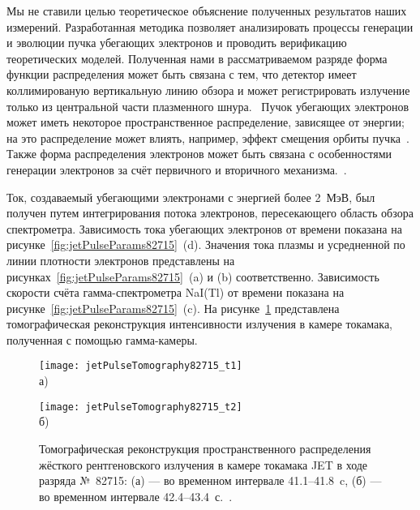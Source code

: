 Мы не ставили целью теоретическое объяснение полученных результатов наших измерений. Разработанная методика позволяет анализировать процессы генерации и эволюции пучка убегающих электронов и проводить верификацию теоретических моделей. Полученная нами в рассматриваемом разряде форма функции распределения может быть связана с тем, что детектор имеет коллимированую вертикальную линию обзора и может регистрировать излучение только из центральной части плазменного шнура.~\cite{Shevelev2013} Пучок убегающих электронов может иметь некоторое пространственное распределение, зависящее от энергии; на это распределение может влиять, например, эффект смещения орбиты пучка~\cite{Knoepfel1979}. Также форма распределения электронов может быть связана с особенностями генерации электронов за счёт первичного и вторичного механизма.~\cite{Helander2002}.

Ток, создаваемый убегающими электронами с энергией более 2~МэВ, был получен путем интегрирования потока электронов, пересекающего область обзора спектрометра. Зависимость тока убегающих электронов от времени показана на рисунке~\ref{fig:jetPulseParams82715}~(d). Значения тока плазмы и усредненной по линии плотности электронов представлены на рисунках~\ref{fig:jetPulseParams82715}~(a) и (b) соответственно. Зависимость скорости счёта гамма-спектрометра NaI(Tl) от времени показана на рисунке~\ref{fig:jetPulseParams82715}~(c). На рисунке~\ref{fig:jetPulseTomography82715} представлена томографическая реконструкция интенсивности излучения в камере токамака, полученная с помощью гамма-камеры.


\begin{figure}[ht]
    \begin{minipage}[b][][b]{0.48\linewidth}\centering
        \texttt{[image: jetPulseTomography82715\_t1]} \\ а)
    \end{minipage}
    \hfill
    \begin{minipage}[b][][b]{0.48\linewidth}\centering
        \texttt{[image: jetPulseTomography82715\_t2]} \\ б)
    \end{minipage}
    \caption{ Томографическая реконструкция пространственного распределения жёсткого рентгеновского излучения в камере токамака JET в ходе разряда №~82715: (а) --- во временном интервале 41.1--41.8~c, (б) --- во временном интервале 42.4--43.4~с.~\cite{Shevelev2013a}. }
    \label{fig:jetPulseTomography82715}
\end{figure}


